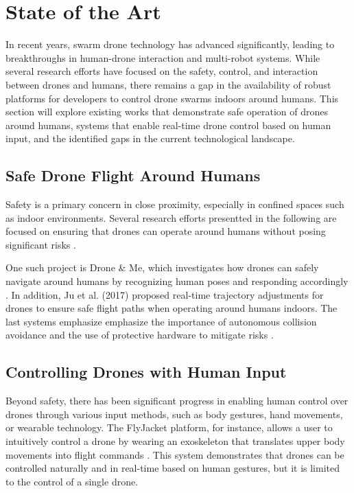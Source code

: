\section{State of the Art}
In recent years, swarm drone technology has advanced significantly, leading to breakthroughs in human-drone interaction and multi-robot systems. While several research efforts have focused on the safety, control, and interaction between drones and humans, there remains a gap in the availability of robust platforms for developers to control drone swarms indoors around humans. This section will explore existing works that demonstrate safe operation of drones around humans, systems that enable real-time drone control based on human input, and the identified gaps in the current technological landscape.

\subsection{Safe Drone Flight Around Humans}

Safety is a primary concern in close proximity, especially in confined spaces such as indoor environments. Several research efforts  presentted in the following are focused on ensuring that drones can operate around humans without posing significant risks \cite{drone_me}.

One such project is Drone \& Me, which investigates how drones can safely navigate around humans by recognizing human poses and responding accordingly \cite{drone_me}. In addition, Ju et al. (2017) proposed real-time trajectory adjustments for drones to ensure safe flight paths when operating around humans indoors. The last systems emphasize emphasize the importance of autonomous collision avoidance and the use of protective hardware to mitigate risks \cite{ju_safety}.

\subsection{ Controlling Drones with Human Input}

Beyond safety, there has been significant progress in enabling human control over drones through various input methods, such as body gestures, hand movements, or wearable technology. The FlyJacket platform, for instance, allows a user to intuitively control a drone by wearing an exoskeleton that translates upper body movements into flight commands \cite{flyjacket}. This system demonstrates that drones can be controlled naturally and in real-time based on human gestures, but it is limited to the control of a single drone.

